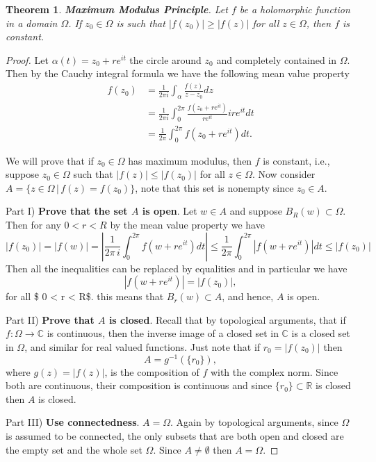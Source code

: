\documentclass{amsart}
\newtheorem{thm}{Theorem}
\begin{document}
\begin{thm}
\textbf{Maximum Modulus Principle}. Let \(f\) be a holomorphic function in a domain \(\Omega\). If \(z_0\in \Omega\) is such that \(|f(z_0)| \geq |f(z)|\) for all \(z\in \Omega\), then  \(f\) is constant.
\end{thm}
\begin{proof}


Let \(\alpha(t) = z_0 + re^{it}\) the circle around \(z_0\) and completely contained in \(\Omega\). Then by the Cauchy integral formula we have the following mean value property
\begin{align*}
f(z_0) &= \frac{1}{2\pi i} \int_{\alpha} \frac{ f(z)}{z - z_0} dz \\
& = \frac{1}{2\pi i} \int_{0}^{2\pi} \frac{ f(z_0 + re^{it})}{re^{it}} ire^{it}dt \\
& = \frac{1}{2\pi } \int_{0}^{2\pi} f(z_0 + re^{it})dt.
\end{align*}

We will prove that if \(z_0\in \Omega\) has maximum modulus, then \(f\) is constant, i.e.,  suppose \(z_0 \in \Omega\) such that \(|f(z) | \leq |f(z_0)|\) for all \(z\in \Omega\). Now consider \(A = \{ z\in \Omega \, | \, f(z) = f(z_0) \}\), note that this set is nonempty since \(z_0 \in A\).

Part I) \textbf{Prove that the set \(A\)  is open}. Let \(w \in A\) and suppose \(B_R(w) \subset \Omega\). Then for any \(0 < r < R\) by the mean value property we have
\[ |f(z_0)| = |f(w)| = \left|\frac{1}{2\pi\,i}\int_{0}^{2\pi} f(w + re^{it})dt \right| \leq  \frac{1}{2\pi } \int_{0}^{2\pi} \left|f(w + re^{it})\right| dt \leq |f(z_0)| \]
Then all the inequalities can be replaced by equalities and in particular we have
\[ |f(w + re^{it})| = |f(z_0)|,\]
for all \$ 0 < r < R\$. this means that \(B_r(w) \subset A\), and hence, \(A\) is open.

Part II) \textbf{Prove that \(A\) is closed}. Recall that by topological arguments, that if \(f:\Omega \to \mathbb{C}\) is continuous, then the inverse image of a closed set in \(\mathbb{C}\) is a closed set in \(\Omega\), and similar for real valued functions. Just note that if \(r_0 = |f(z_0)|\) then
\[ A = g^{-1}(\{r_0\}), \]
where \(g(z) = |f(z)|\), is the composition of \(f\) with the complex norm. Since both are continuous, their composition is continuous and since \(\{r_0\}\subset\mathbb{R}\) is closed then \(A\) is closed.

Part III) \textbf{Use connectedness}. \(A = \Omega\). Again by topological arguments, since \(\Omega\) is assumed to be connected, the only subsets that are both open and closed are the empty set and the whole set \(\Omega\). Since \(A \neq \emptyset\) then \(A=\Omega\).
\end{proof}
\end{document}
